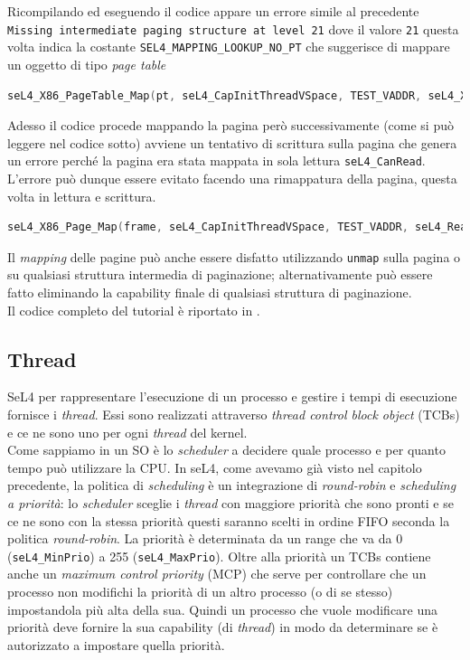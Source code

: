 Ricompilando ed eseguendo il codice appare un errore simile al precedente \texttt{Missing intermediate paging structure at level 21} dove il valore \texttt{21} questa volta indica la costante \texttt{SEL4\_MAPPING\_LOOKUP\_NO\_PT} che suggerisce di mappare un oggetto di tipo \textit{page table}
\begin{lstlisting}[language=C++]
seL4_X86_PageTable_Map(pt, seL4_CapInitThreadVSpace, TEST_VADDR, seL4_X86_Default_VMAttributes);
\end{lstlisting}

Adesso il codice procede mappando la pagina però successivamente (come si può leggere nel codice sotto) avviene un tentativo di scrittura sulla pagina che genera un errore perché la pagina era stata mappata in sola lettura \texttt{seL4\_CanRead}. L'errore può dunque essere evitato facendo una rimappatura della pagina, questa volta in lettura e scrittura.
\begin{lstlisting}[language=C++]
seL4_X86_Page_Map(frame, seL4_CapInitThreadVSpace, TEST_VADDR, seL4_ReadWrite, seL4_X86_Default_VMAttributes);
\end{lstlisting}

Il \textit{mapping} delle pagine può anche essere disfatto utilizzando \texttt{unmap} sulla pagina o su qualsiasi struttura intermedia di paginazione; alternativamente può essere fatto eliminando la capability finale di qualsiasi struttura di paginazione.\\
Il codice completo del tutorial è riportato in \cite{mapping}.

\subsection{Thread}
SeL4 per rappresentare l'esecuzione di un processo e gestire i tempi di esecuzione fornisce i \textit{thread}. Essi sono realizzati attraverso \textit{thread control block object} (TCBs) e ce ne sono uno per ogni \textit{thread} del kernel.\\
Come sappiamo in un SO è lo \textit{scheduler} a decidere quale processo e per quanto tempo può utilizzare la CPU. In seL4, come avevamo già visto nel capitolo precedente, la politica di \textit{scheduling} è un integrazione di \textit{round-robin} e \textit{scheduling a priorità}: lo \textit{scheduler} sceglie i \textit{thread} con maggiore priorità che sono pronti e se ce ne sono con la stessa priorità questi saranno scelti in ordine FIFO seconda la politica \textit{round-robin}. La priorità è determinata da un range che va da 0 (\texttt{seL4\_MinPrio}) a 255 (\texttt{seL4\_MaxPrio}). Oltre alla priorità un TCBs contiene anche un \textit{maximum control priority} (MCP) che serve per controllare che un processo non modifichi la priorità di un altro processo (o di se stesso) impostandola più alta della sua. Quindi un processo che vuole modificare una priorità deve fornire la sua capability (di \textit{thread}) in modo da determinare se è autorizzato a impostare quella priorità.

